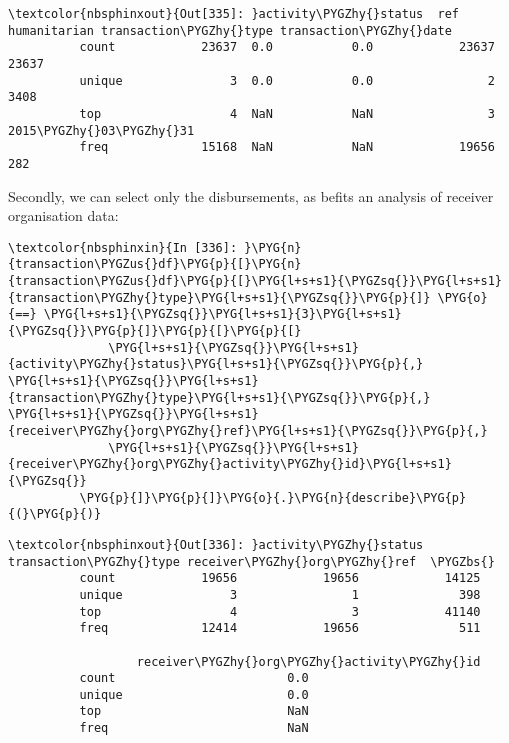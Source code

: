 \documentclass[letterpaper,10pt,english]{sphinxmanual}
\begin{document}
\begin{Verbatim}[commandchars=\\\{\}]
\textcolor{nbsphinxout}{Out[335]: }activity\PYGZhy{}status  ref  humanitarian transaction\PYGZhy{}type transaction\PYGZhy{}date
          count            23637  0.0           0.0            23637            23637
          unique               3  0.0           0.0                2             3408
          top                  4  NaN           NaN                3       2015\PYGZhy{}03\PYGZhy{}31
          freq             15168  NaN           NaN            19656              282
\end{Verbatim}

Secondly, we can select only the disbursements, as befits an analysis of
receiver organisation data:

\begin{Verbatim}[commandchars=\\\{\}]
\textcolor{nbsphinxin}{In [336]: }\PYG{n}{transaction\PYGZus{}df}\PYG{p}{[}\PYG{n}{transaction\PYGZus{}df}\PYG{p}{[}\PYG{l+s+s1}{\PYGZsq{}}\PYG{l+s+s1}{transaction\PYGZhy{}type}\PYG{l+s+s1}{\PYGZsq{}}\PYG{p}{]} \PYG{o}{==} \PYG{l+s+s1}{\PYGZsq{}}\PYG{l+s+s1}{3}\PYG{l+s+s1}{\PYGZsq{}}\PYG{p}{]}\PYG{p}{[}\PYG{p}{[}
              \PYG{l+s+s1}{\PYGZsq{}}\PYG{l+s+s1}{activity\PYGZhy{}status}\PYG{l+s+s1}{\PYGZsq{}}\PYG{p}{,} \PYG{l+s+s1}{\PYGZsq{}}\PYG{l+s+s1}{transaction\PYGZhy{}type}\PYG{l+s+s1}{\PYGZsq{}}\PYG{p}{,} \PYG{l+s+s1}{\PYGZsq{}}\PYG{l+s+s1}{receiver\PYGZhy{}org\PYGZhy{}ref}\PYG{l+s+s1}{\PYGZsq{}}\PYG{p}{,}
              \PYG{l+s+s1}{\PYGZsq{}}\PYG{l+s+s1}{receiver\PYGZhy{}org\PYGZhy{}activity\PYGZhy{}id}\PYG{l+s+s1}{\PYGZsq{}}
          \PYG{p}{]}\PYG{p}{]}\PYG{o}{.}\PYG{n}{describe}\PYG{p}{(}\PYG{p}{)}
\end{Verbatim}

\begin{Verbatim}[commandchars=\\\{\}]
\textcolor{nbsphinxout}{Out[336]: }activity\PYGZhy{}status transaction\PYGZhy{}type receiver\PYGZhy{}org\PYGZhy{}ref  \PYGZbs{}
          count            19656            19656            14125
          unique               3                1              398
          top                  4                3            41140
          freq             12414            19656              511
          
                  receiver\PYGZhy{}org\PYGZhy{}activity\PYGZhy{}id
          count                        0.0
          unique                       0.0
          top                          NaN
          freq                         NaN
\end{Verbatim}
\end{document}
